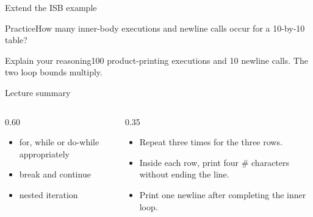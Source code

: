 \documentclass[10pt,aspectratio=169]{beamer}
\begin{document}
\begin{frame}[fragile,t]{Extend the ISB example}
\begin{alertblock}{Practice}How many inner{-}body executions and newline calls occur for a 10{-}by{-}10 table?\end{alertblock}\vspace{3mm}\begin{exampleblock}{Explain your reasoning}100 product{-}printing executions and 10 newline calls. The two loop bounds multiply.\end{exampleblock}
\end{frame}
\begin{frame}[fragile,t]{Lecture summary}
\begin{columns}[T,onlytextwidth]\begin{column}{0.60\textwidth}
\begin{itemize}
\item for, while or do-while appropriately
\item break and continue
\item nested iteration
\end{itemize}
\end{column}\begin{column}{0.35\textwidth}\small
\begin{itemize}
\item Repeat three times for the three rows.
\item Inside each row, print four \# characters without ending the line.
\item Print one newline after completing the inner loop.
\end{itemize}
\end{column}\end{columns}
\end{frame}
\end{document}
